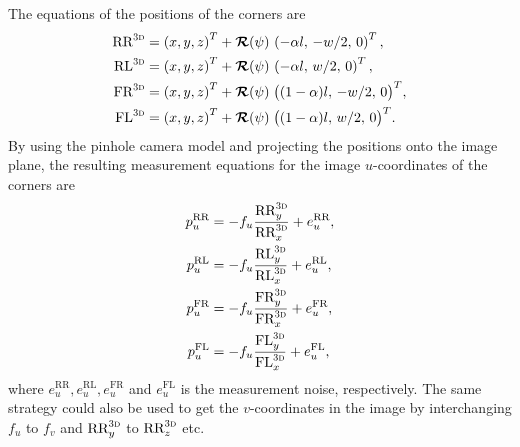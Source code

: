 The equations of the  positions of the corners are
%
\begin{align}
	\text{RR}^{\text{\textsc{{3}d}}} &=
	\left( x,  y, z \right)^T + \bm{\mathcal{R}}(\psi) \, \left( -\alpha l, \, -w/2, \, 0 \right)^T, \\
	\text{RL}^{\text{\textsc{{3}d}}} &=
	\left( x,  y, z \right)^T + \bm{\mathcal{R}}(\psi) \, \left( -\alpha l, \, w/2, \, 0 \right)^T, \\
	\text{FR}^{\text{\textsc{{3}d}}} &=
	\left( x,  y, z \right)^T + \bm{\mathcal{R}}(\psi) \; \big( (1-\alpha)l, \, -w/2, \, 0 \big)^T, \\
	\text{FL}^{\text{\textsc{{3}d}}} &=
	\left( x,  y, z \right)^T + \bm{\mathcal{R}}(\psi) \; \big( (1-\alpha)l, \, w/2, \, 0 \big)^T.
\end{align}
%
By using the pinhole camera model and projecting the  positions onto the image plane, the resulting measurement equations for the image $u$-coordinates of the corners are
%
\begin{align}
	p^\text{RR}_u &= -f_u \frac{\text{RR}_y^{\text{\textsc{{3}d}}}}{\text{RR}_x^{\text{\textsc{{3}d}}}} + e^\text{RR}_u, \\
	p^\text{RL}_u &= -f_u \frac{\text{RL}_y^{\text{\textsc{{3}d}}}}{\text{RL}_x^{\text{\textsc{{3}d}}}} + e^\text{RL}_u, \\
	p^\text{FR}_u &= -f_u \frac{\text{FR}_y^{\text{\textsc{{3}d}}}}{\text{FR}_x^{\text{\textsc{{3}d}}}} + e^\text{FR}_u, \\
	p^\text{FL}_u &= -f_u \frac{\text{FL}_y^{\text{\textsc{{3}d}}}}{\text{FL}_x^{\text{\textsc{{3}d}}}} + e^\text{FL}_u,
\end{align}
%
where $e^\text{RR}_u, e^\text{RL}_u, e^\text{FR}_u$ and $e^\text{FL}_u$ is the measurement noise, respectively.
The same strategy could also be used to get the $v$-coordinates in the image by interchanging $f_u$ to $f_v$ and $\text{RR}_y^\text{\textsc{{3}d}}$ to $\text{RR}_z^\text{\textsc{{3}d}}$ etc.

